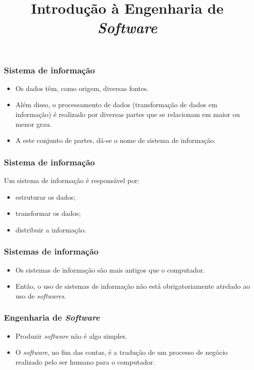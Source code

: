\documentclass[11pt]{beamer}
\title{Introdução à Engenharia de \textit{Software}}
\author{}
\date{}
\begin{document}
    \begin{frame}[plain]
        \titlepage
    \end{frame}

    \begin{frame}
      \frametitle{Sistema de informação}
      \begin{itemize}
        \item Os dados têm, como origem, diversas fontes.
        \item Além disso, o processamento de dados (transformação de dados em informação) é realizado por diversas partes que se relacionam em maior ou menor grau.
        \item A este conjunto de partes, dá-se o nome de sistema de informação.
      \end{itemize}
    \end{frame}

    \begin{frame}
      \frametitle{Sistema de informação}
      Um sistema de informação é responsável por:
      \begin{itemize}
        \item estruturar os dados;
        \item transformar os dados;
        \item distribuir a informação.
      \end{itemize}
    \end{frame}

    \begin{frame}
      \frametitle{Sistemas de informação}
      \begin{itemize}
        \item Os sistemas de informação são mais antigos que o computador.
        \item Então, o uso de sistemas de informação não está obrigatoriamente atrelado ao uso de \textit{softwares}.
      \end{itemize}
    \end{frame}

    \begin{frame}
      \frametitle{Engenharia de \textit{Software}}
      \begin{itemize}
        \item Produzir \textit{software} não é algo simples.
        \item O \textit{software}, no fim das contas, é a tradução de um processo de negócio realizado pelo ser humano para o computador.
      \end{itemize}
    \end{frame}
    
\end{document}
